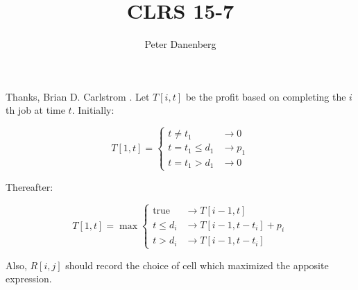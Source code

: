 \documentclass{article}
\title{CLRS 15-7}
\author{Peter Danenberg}
\begin{document}
\maketitle

Thanks, Brian D. Carlstrom \cite{carlstrom:04}. Let $T[i,t]$ be the
profit based on completing the $i$th job at time $t$. Initially:

\[T[1,t]=\left\{
  \begin{aligned}
    t\neq t_1 &\to 0\\
    t=t_1\leq d_1 &\to p_1\\
    t=t_1>d_1 &\to 0
  \end{aligned}
  \right.\]

Thereafter:

\[T[1,t]=\max\left\{
  \begin{aligned}
    \text{true} &\to T[i-1,t]\\
    t\leq d_i &\to T[i-1,t-t_i]+p_i\\
    t>d_i &\to T[i-1,t-t_i]
  \end{aligned}
  \right.\]

Also, $R[i,j]$ should record the choice of cell which maximized the
apposite expression.



\end{document}
